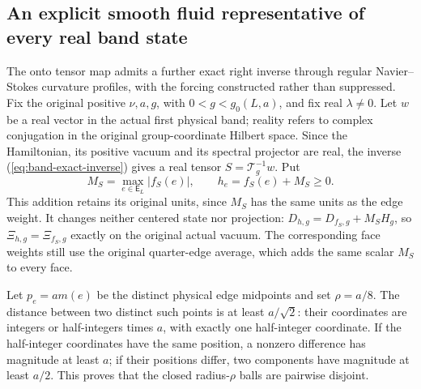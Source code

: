 \subsection{An explicit smooth fluid representative of every real band state}

The onto tensor map admits a further exact right inverse through
regular Navier--Stokes curvature profiles, with the forcing constructed
rather than suppressed. Fix the original positive $\nu,a,g$, with
$0<g<g_0(L,a)$, and fix real $\lambda\ne0$. Let $w$ be a real
vector in the actual first physical band; reality refers to complex
conjugation in the original group-coordinate Hilbert space. Since
the Hamiltonian, its positive vacuum and its spectral projector are
real, the inverse (\ref{eq:band-exact-inverse}) gives a real tensor
$S=\mathcal T_g^{-1}w$. Put
\begin{equation}\label{eq:band-positive-edge-profile}
 M_S=\max_{e\in\mathsf E_L}|f_S(e)|,\qquad h_e=f_S(e)+M_S\ge0.
\end{equation}
This addition retains its original units, since $M_S$ has the same
units as the edge weight. It changes neither centered state nor
projection: $D_{h,g}=D_{f_S,g}+M_SH_g$, so
$\Xi_{h,g}=\Xi_{f_S,g}$ exactly on the original actual vacuum.
The corresponding face weights still use the original quarter-edge
average, which adds the same scalar $M_S$ to every face.

Let $p_e=a m(e)$ be the distinct physical edge midpoints and set
$\rho=a/8$. The distance between two distinct such points is at
least $a/\sqrt2$: their coordinates are integers or half-integers
times $a$, with exactly one half-integer coordinate. If the
half-integer coordinates have the same position, a nonzero
difference has magnitude at least $a$; if their positions differ,
two components have magnitude at least $a/2$. This proves that
the closed radius-$\rho$ balls are pairwise disjoint.

